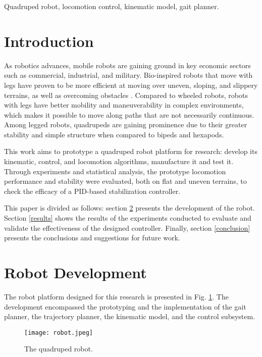\documentclass[conference]{IEEEtran}
\begin{document}
\begin{IEEEkeywords}
  Quadruped robot, locomotion control, kinematic model, gait planner.
\end{IEEEkeywords}

\section{Introduction}

As robotics advances, mobile robots are gaining ground in key economic sectors such as commercial, industrial, and military. Bio-inspired robots that move with legs have proven to be more efficient at moving over uneven, sloping, and slippery terrains, as well as overcoming obstacles \cite{X.134}. Compared to wheeled robots, robots with legs have better mobility and maneuverability in complex environments, which makes it possible to move along paths that are not necessarily continuous. Among legged robots, quadrupeds are gaining prominence due to their greater stability and simple structure when compared to bipeds and hexapods.

This work aims to prototype a quadruped robot platform for research: develop its kinematic, control, and locomotion algorithms, manufacture it and test it. Through experiments and statistical analysis, the prototype locomotion performance and stability were evaluated, both on flat and uneven terrains, to check the efficacy of a PID-based stabilization controller.

This paper is divided as follows: section \ref{development} presents the development of the robot. Section \ref{results} shows the results of the experiments conducted to evaluate and validate the effectiveness of the designed controller. Finally, section \ref{conclusion} presents the conclusions and suggestions for future work.

\section{Robot Development} \label{development}

The robot platform designed for this research is presented in Fig. \ref{fig:robot}. The development encompassed the prototyping and the implementation of the gait planner, the trajectory planner, the kinematic model, and the control subsystem.

\begin{figure}[!tb]
  \centering
  \texttt{[image: robot.jpeg]}
  \vfill
  \caption{The quadruped robot.}
  \label{fig:robot}
  \vspace{-\baselineskip}
\end{figure}
\end{document}
